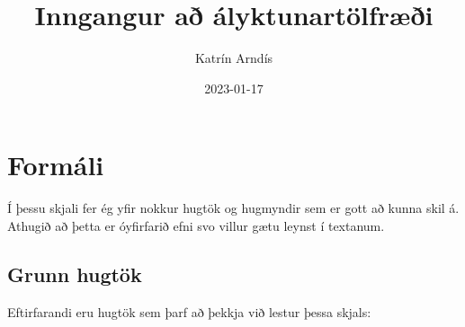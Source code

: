 \documentclass[
]{book}
\title{Inngangur að ályktunartölfræði}
\author{Katrín Arndís}
\date{2023-01-17}
\begin{document}
\maketitle

{
\setcounter{tocdepth}{1}
\tableofcontents
}
\hypertarget{formuxe1li}{%
\chapter{Formáli}\label{formuxe1li}}

Í þessu skjali fer ég yfir nokkur hugtök og hugmyndir sem er gott að kunna skil á. Athugið að þetta er óyfirfarið efni svo villur gætu leynst í textanum.

\hypertarget{grunn-hugtuxf6k}{%
\section{Grunn hugtök}\label{grunn-hugtuxf6k}}

Eftirfarandi eru hugtök sem þarf að þekkja við lestur þessa skjals:
\end{document}
